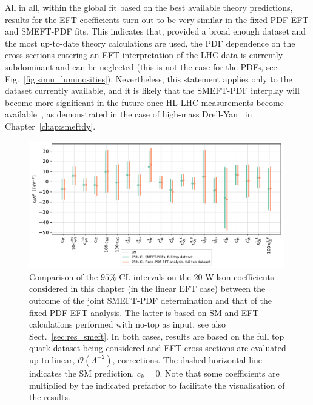 \documentclass[withindex,glossary]{cam-thesis}
\begin{document}
All in all, within  the global fit based on the best available theory predictions,
results for the EFT coefficients turn out to be very similar
in the fixed-PDF EFT and SMEFT-PDF fits.
%
This indicates that, provided a broad enough dataset and the most
up-to-date theory calculations are used, the PDF dependence on the cross-sections
entering an EFT interpretation of the LHC data is currently
subdominant and can be neglected (this is not the case for the
PDFs, see Fig.~\ref{fig:simu_luminosities}).
%
Nevertheless, this statement applies only to the dataset currently available,
and it is likely that the SMEFT-PDF interplay will become more significant in the future
once HL-LHC measurements become available~\cite{AbdulKhalek:2018rok,Azzi:2019yne},
as demonstrated in the case of high-mass Drell-Yan~\cite{Greljo:2021kvv} in Chapter~\ref{chap:smeftdy}.

\begin{figure}[t!]
\centering
\includegraphics[width=0.99\textwidth]{smeft_plots/smeft-pdf-95cl-bounds.pdf}
\caption{
  Comparison of the $95 \%$ CL intervals on the 20 Wilson coefficients
  considered in this chapter (in the linear EFT case) between the outcome of the joint SMEFT-PDF determination
  and that of the fixed-PDF EFT analysis.
  The latter is based on SM and EFT calculations performed with
 no-top as input, see also Sect.~\ref{sec:res_smeft}.
  In both cases, results are based on the full 
  top quark dataset being considered and EFT cross-sections
	are evaluated up  to linear, $\mathcal{O}\left( \Lambda^{-2}\right)$, corrections.
  The dashed horizontal line indicates the SM prediction, $c_k=0$.
  Note that some coefficients are multiplied by the indicated prefactor
  to facilitate the visualisation of the results. 
}
\label{fig:smeft_simu_bounds}
\end{figure}
\end{document}
